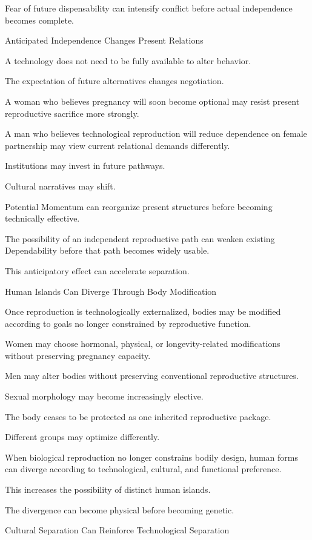 Fear of future dispensability can intensify conflict before actual independence becomes complete.

Anticipated Independence Changes Present Relations

A technology does not need to be fully available to alter behavior.

The expectation of future alternatives changes negotiation.

A woman who believes pregnancy will soon become optional may resist present reproductive sacrifice more strongly.

A man who believes technological reproduction will reduce dependence on female partnership may view current relational demands differently.

Institutions may invest in future pathways.

Cultural narratives may shift.

Potential Momentum can reorganize present structures before becoming technically effective.

The possibility of an independent reproductive path can weaken existing Dependability before that path becomes widely usable.

This anticipatory effect can accelerate separation.

Human Islands Can Diverge Through Body Modification

Once reproduction is technologically externalized, bodies may be modified according to goals no longer constrained by reproductive function.

Women may choose hormonal, physical, or longevity-related modifications without preserving pregnancy capacity.

Men may alter bodies without preserving conventional reproductive structures.

Sexual morphology may become increasingly elective.

The body ceases to be protected as one inherited reproductive package.

Different groups may optimize differently.

When biological reproduction no longer constrains bodily design, human forms can diverge according to technological, cultural, and functional preference.

This increases the possibility of distinct human islands.

The divergence can become physical before becoming genetic.

Cultural Separation Can Reinforce Technological Separation

